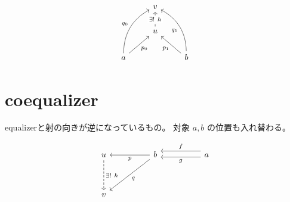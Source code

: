 \documentclass[uplatex,a4j,12pt,dvipdfmx]{jsarticle}
\begin{document}
\[
	\begin{tikzcd}
		& v                                                &                                                        \\
		& u \arrow[u, "\exists ! \ h" description, dashed] &                                                        \\
		a \arrow[ru, "p_{0}"'] \arrow[ruu, "q_{0}", bend left] &                                                  & b \arrow[lu, "p_{1}"] \arrow[luu, "q_{1}", bend right]
	\end{tikzcd}
\]


\section{coequalizer}

equalizerと射の向きが逆になっているもの。
対象 $a,b$ の位置も入れ替わる。

\[
	\begin{tikzcd}
		u \arrow[dd, "\exists ! \ h", dashed] &  & b \arrow[ll, "p"] \arrow[lldd, "q"] &  & a \arrow[ll, "f"', shift right=2] \arrow[ll, "g", shift left] \\
		&  &                                     &  &                                                               \\
		v                                     &  &                                     &  &
	\end{tikzcd}
\]
\end{document}
